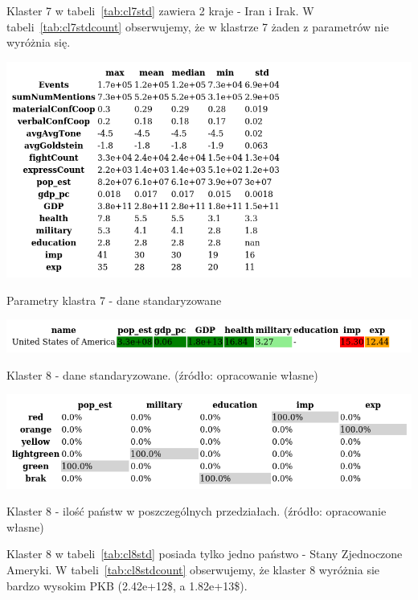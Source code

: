 \documentclass[11pt]{report}
\begin{document}
    Klaster 7 w tabeli~\ref{tab:cl7std} zawiera 2 kraje - Iran i Irak.
    W tabeli~\ref{tab:cl7stdcount} obserwujemy, że w klastrze 7 żaden z parametrów nie wyróżnia się.

    \begin{table}[!htp]
        \centering
        \includegraphics[width=\linewidth]{tables/CLUST/desc/clust7std_desc.png}
        \caption{Parametry klastra 7 - dane standaryzowane}
        \label{tab:cl7std_desc}
    \end{table}

    \begin{table}[!htp]
        \centering
        \includegraphics[width=\linewidth]{tables/CLUST/cluster8stdkmeans.png}
        \caption{Klaster 8 - dane standaryzowane. (źródło: opracowanie własne)}
        \label{tab:cl8std}
    \end{table}

    \begin{table}[!htp]
        \centering
        \includegraphics[width=\linewidth]{tables/CLUST/cluster8stdkmeanscount.png}
        \caption{Klaster 8 - ilość państw w poszczególnych przedziałach. (źródło: opracowanie własne)}
        \label{tab:cl8stdcount}
    \end{table}

    Klaster 8 w tabeli~\ref{tab:cl8std} posiada tylko jedno państwo - Stany Zjednoczone Ameryki.
    W tabeli~\ref{tab:cl8stdcount} obserwujemy, że klaster 8 wyróżnia sie bardzo wysokim PKB (2.42e+12\$, a 1.82e+13\$).
\end{document}
